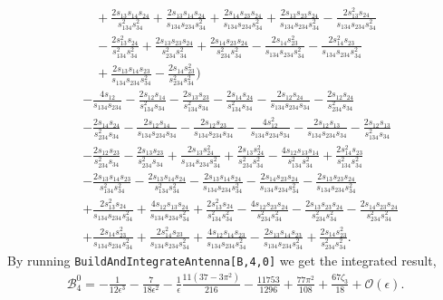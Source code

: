 \begin{align}
  & \quad + \frac{2s_{13}s_{14}s_{24}}{s_{134}^2s_{34}^2} + \frac{2s_{13}s_{14}s_{24}}{s_{134}s_{234}s_{34}^2} + \frac{2s_{14}s_{23}s_{24}}{s_{134}s_{234}s_{34}^2} + \frac{2s_{13}s_{23}s_{24}}{s_{134}s_{234}s_{34}^2} - \frac{2s_{13}^2s_{24}}{s_{134}s_{234}s_{34}^2} \nonumber \\
  & \quad - \frac{2s_{13}^2s_{24}}{s_{134}^2s_{34}^2} + \frac{2s_{13}s_{23}s_{24}}{s_{234}^2s_{34}^2} + \frac{2s_{14}s_{23}s_{24}}{s_{234}^2s_{34}^2} - \frac{2s_{14}s_{23}^2}{s_{134}s_{234}s_{34}^2} - \frac{2s_{14}^2s_{23}}{s_{134}s_{234}s_{34}^2} \nonumber \\
  & \quad + \frac{2s_{13}s_{14}s_{23}}{s_{134}s_{234}s_{34}^2} - \frac{2s_{14}s_{23}^2}{s_{234}^2s_{34}^2} \Bigg) \nonumber \\
& - \frac{4s_{12}}{s_{134}s_{234}} - \frac{2s_{12}s_{14}}{s_{134}^2s_{34}} - \frac{2s_{13}s_{23}}{s_{134}^2s_{34}} - \frac{2s_{14}s_{24}}{s_{134}^2s_{34}} - \frac{2s_{12}s_{24}}{s_{134}s_{234}s_{34}} - \frac{2s_{12}s_{24}}{s_{234}^2s_{34}} \nonumber \\
& - \frac{2s_{14}s_{24}}{s_{234}^2s_{34}} - \frac{2s_{12}s_{14}}{s_{134}s_{234}s_{34}} - \frac{2s_{12}s_{23}}{s_{134}s_{234}s_{34}} - \frac{4s_{12}^2}{s_{134}s_{234}s_{34}} - \frac{2s_{12}s_{13}}{s_{134}s_{234}s_{34}} - \frac{2s_{12}s_{13}}{s_{134}^2s_{34}} \nonumber \\
& - \frac{2s_{12}s_{23}}{s_{234}^2s_{34}} - \frac{2s_{13}s_{23}}{s_{234}^2s_{34}} + \frac{2s_{13}s_{24}^2}{s_{134}s_{234}s_{34}^2} + \frac{2s_{13}s_{24}^2}{s_{234}^2s_{34}^2} - \frac{4s_{12}s_{13}s_{14}}{s_{134}^2s_{34}^2} + \frac{2s_{14}^2s_{23}}{s_{134}^2s_{34}^2} \nonumber \\
& - \frac{2s_{13}s_{14}s_{23}}{s_{134}^2s_{34}^2} - \frac{2s_{13}s_{14}s_{24}}{s_{134}^2s_{34}^2} - \frac{2s_{13}s_{14}s_{24}}{s_{134}s_{234}s_{34}^2} - \frac{2s_{14}s_{23}s_{24}}{s_{134}s_{234}s_{34}^2} - \frac{2s_{13}s_{23}s_{24}}{s_{134}s_{234}s_{34}^2} \nonumber \\
& + \frac{2s_{13}^2s_{24}}{s_{134}s_{234}s_{34}^2} + \frac{4s_{12}s_{13}s_{24}}{s_{134}s_{234}s_{34}^2} + \frac{2s_{13}^2s_{24}}{s_{134}^2s_{34}^2} - \frac{4s_{12}s_{23}s_{24}}{s_{234}^2s_{34}^2} - \frac{2s_{13}s_{23}s_{24}}{s_{234}^2s_{34}^2} - \frac{2s_{14}s_{23}s_{24}}{s_{234}^2s_{34}^2} \nonumber \\
& + \frac{2s_{14}s_{23}^2}{s_{134}s_{234}s_{34}^2} + \frac{2s_{14}^2s_{23}}{s_{134}s_{234}s_{34}^2} + \frac{4s_{12}s_{14}s_{23}}{s_{134}s_{234}s_{34}^2} - \frac{2s_{13}s_{14}s_{23}}{s_{134}s_{234}s_{34}^2} + \frac{2s_{14}s_{23}^2}{s_{234}^2s_{34}^2}.
\end{align}
By running \texttt{BuildAndIntegrateAntenna[B,4,0]} we get the integrated result, 
\begin{equation}
    \begin{gathered}
        \mathcal B_4^0 = -\frac1{12\epsilon^3}-\frac7{18\epsilon^2}-\frac1\epsilon\frac{11\!\left(37-3\pi^2\right)}{216}-\frac{11753}{1296}+\frac{77\pi^2}{108}+\frac{67\zeta_3}{18}+\mathcal O(\epsilon).
    \end{gathered}
\end{equation}

